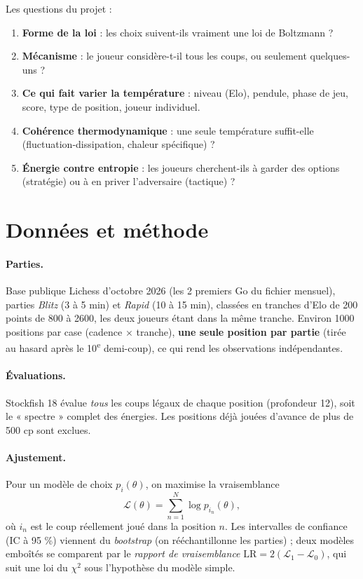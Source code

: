 \documentclass[11pt,a4paper]{article}
\begin{document}
Les questions du projet :
\begin{enumerate}
  \item \textbf{Forme de la loi} : les choix suivent-ils vraiment une loi de Boltzmann ?
  \item \textbf{Mécanisme} : le joueur considère-t-il tous les coups, ou seulement quelques-uns ?
  \item \textbf{Ce qui fait varier la température} : niveau (Elo), pendule, phase de jeu, score, type de position,
        joueur individuel.
  \item \textbf{Cohérence thermodynamique} : une seule température suffit-elle (fluctuation-dissipation,
        chaleur spécifique) ?
  \item \textbf{Énergie contre entropie} : les joueurs cherchent-ils à garder des options (stratégie) ou à
        en priver l'adversaire (tactique) ?
\end{enumerate}

\section{Données et méthode}

\paragraph{Parties.} Base publique Lichess d'octobre 2026 (les 2 premiers Go du fichier mensuel), parties
\emph{Blitz} (3 à 5 min) et \emph{Rapid} (10 à 15 min), classées en tranches d'Elo de 200 points de 800 à 2600,
les deux joueurs étant dans la même tranche. Environ 1000 positions par case (cadence $\times$ tranche),
\textbf{une seule position par partie} (tirée au hasard après le 10\textsuperscript{e} demi-coup), ce qui rend les
observations indépendantes.

\paragraph{Évaluations.} Stockfish 18 évalue \emph{tous} les coups légaux de chaque position (profondeur 12),
soit le « spectre » complet des énergies. Les positions déjà jouées d'avance de plus de 500 cp sont exclues.

\paragraph{Ajustement.} Pour un modèle de choix $p_i(\theta)$, on maximise la vraisemblance
\begin{equation}
  \mathcal{L}(\theta) = \sum_{n=1}^{N} \log p_{i_n}(\theta),
\end{equation}
où $i_n$ est le coup réellement joué dans la position $n$. Les intervalles de confiance (IC à 95 \%) viennent
du \emph{bootstrap} (on rééchantillonne les parties) ; deux modèles emboîtés se comparent par le
\emph{rapport de vraisemblance} $\mathrm{LR} = 2(\mathcal{L}_1 - \mathcal{L}_0)$, qui suit une loi du $\chi^2$
sous l'hypothèse du modèle simple.
\end{document}
